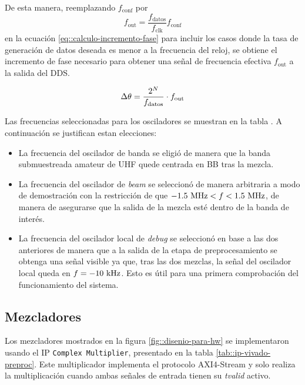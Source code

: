 \documentclass[../../main.tex]{subfiles}
\begin{document}
De esta manera, reemplazando $f_\textrm{conf}$ por \[f_\textrm{out} = \frac{f_\textrm{datos}}{f_\textrm{clk}}f_\textrm{conf}\] en la ecuación \ref{eq::calculo-incremento-fase} para incluir los casos donde la tasa de generación de datos deseada es menor a la frecuencia del reloj, se obtiene el incremento de fase necesario para obtener una señal de frecuencia efectiva $f_\textrm{out}$ a la salida del DDS.

\begin{equation}
    \Delta \theta = \frac{2^N}{f_\textrm{datos}} \cdot f_\textrm{out} \\
    \label{eq::calculo-incremento-fase-v2}
\end{equation}

Las frecuencias seleccionadas para los osciladores se muestran en la tabla . A continuación se justifican estan elecciones:
\begin{itemize}
    \item La frecuencia del oscilador de banda se eligió de manera que la banda submuestreada amateur de UHF quede centrada en BB tras la mezcla.
    \item La frecuencia del oscilador de \textit{beam} se seleccionó de manera arbitraria a modo de demostración con la restricción de que $-1.5~\textrm{MHz}<f<1.5~\textrm{MHz}$, de manera de asegurarse que la salida de la mezcla esté dentro de la banda de interés.
    \item La frecuencia del oscilador local de \textit{debug} se seleccionó en base a las dos anteriores de manera que a la salida de la etapa de preprocesamiento se obtenga una señal visible ya que, tras las dos mezclas, la señal del oscilador local queda en $f = -10~\textrm{kHz}$. Esto es útil para una primera comprobación del funcionamiento del sistema.
\end{itemize}


\subsection{Mezcladores}
Los mezcladores mostrados en la figura \ref{fig::disenio-para-hw} se implementaron usando el IP \texttt{Complex Multiplier}, presentado en la tabla \ref{tab::ip-vivado-preproc}. Este multiplicador implementa el protocolo AXI4-Stream y solo realiza la multiplicación cuando ambas señales de entrada tienen su \textit{tvalid} activo.
\end{document}
